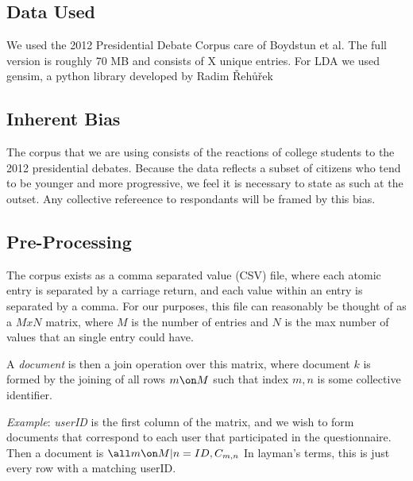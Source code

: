 \subsection{Data Used}
We used the 2012  Presidential Debate Corpus care of Boydstun et al. The full version is roughly 70 MB and consists of X unique entries.
For LDA we used gensim, a python library developed by Radim Řehůřek \cite{gensim}

\subsection{Inherent Bias}
The corpus that we are using consists of the reactions of college students to the 2012 presidential debates. Because the data reflects a subset of citizens who tend to be younger and more progressive, we feel it is necessary to state as such at the outset. Any collective refereence to respondants will be framed by this bias.

\subsection{Pre-Processing}
The corpus exists as a comma separated value (CSV) file, where each atomic entry is separated by a carriage return, and each value within an entry is separated by a comma. For our purposes, this file can reasonably be thought of as a $MxN$ matrix, where $M$ is the number of entries and $N$ is the max number of values that an single entry could have.

A \emph{document} is then a join operation over this matrix, where document $k$ is formed by the joining of all rows $m \on M$ such that index $m,n$ is some collective identifier.

\emph{Example}: \emph{userID} is the first column of the matrix, and we wish to form documents that correspond to each user that participated in the questionnaire. Then a document is $\all m \on M | n = ID ,C_{m,n}$ In layman's terms, this is just every row with a matching userID.

